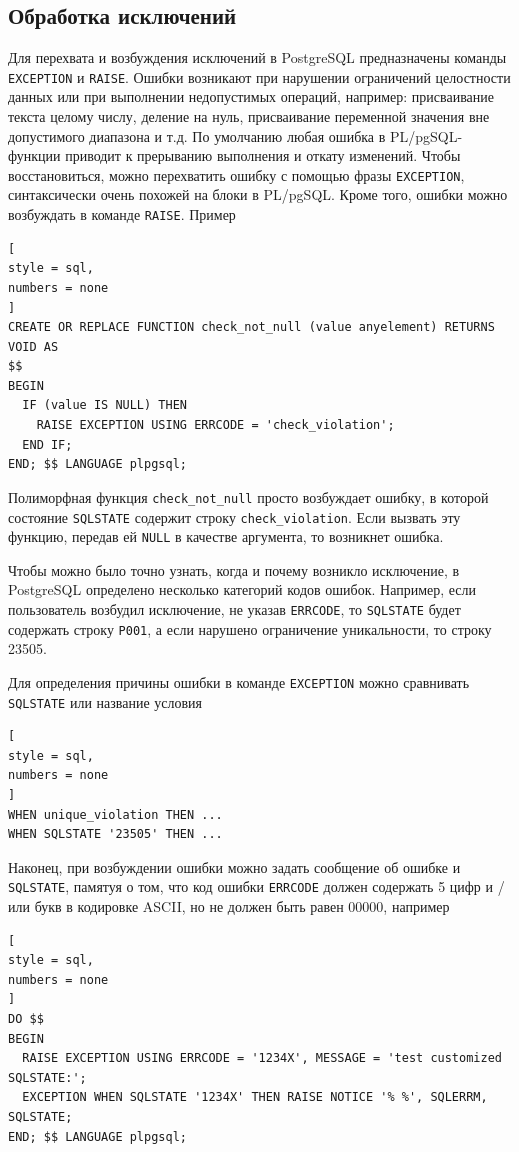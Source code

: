 \documentclass[%
	11pt,
	a4paper,
	utf8,
		]{article}
\begin{document}
\subsection{Обработка исключений}

Для перехвата и возбуждения исключений в PostgreSQL предназначены команды \texttt{EXCEPTION} и \texttt{RAISE}. Ошибки возникают при нарушении ограничений целостности данных или при выполнении недопустимых операций, например: присваивание текста целому числу, деление на нуль, присваивание переменной значения вне допустимого диапазона и т.д. По умолчанию любая ошибка в PL/pgSQL-функции приводит к прерыванию выполнения и откату изменений. Чтобы восстановиться, можно перехватить ошибку с помощью фразы \texttt{EXCEPTION}, синтаксически очень похожей на блоки в PL/pgSQL. Кроме того, ошибки можно возбуждать в команде \texttt{RAISE}.
Пример
\begin{lstlisting}[
style = sql,
numbers = none
]
CREATE OR REPLACE FUNCTION check_not_null (value anyelement) RETURNS VOID AS 
$$
BEGIN
  IF (value IS NULL) THEN
    RAISE EXCEPTION USING ERRCODE = 'check_violation';
  END IF;
END; $$ LANGUAGE plpgsql;
\end{lstlisting}

Полиморфная функция \texttt{check\_not\_null} просто возбуждает ошибку, в которой состояние \texttt{SQLSTATE} содержит строку \texttt{check\_violation}. Если вызвать эту функцию, передав ей \texttt{NULL} в качестве аргумента, то возникнет ошибка.

Чтобы можно было точно узнать, когда и почему возникло исключение, в PostgreSQL определено несколько категорий кодов ошибок. Например, если пользователь возбудил исключение, не указав \texttt{ERRCODE}, то \texttt{SQLSTATE} будет содержать строку \texttt{P001}, а если нарушено ограничение уникальности, то строку 23505.

Для определения причины ошибки в команде \texttt{EXCEPTION} можно сравнивать \texttt{SQLSTATE} или название условия
\begin{lstlisting}[
style = sql,
numbers = none
]
WHEN unique_violation THEN ...
WHEN SQLSTATE '23505' THEN ...
\end{lstlisting}

Наконец, при возбуждении ошибки можно задать сообщение об ошибке и \texttt{SQLSTATE}, памятуя о том, что код ошибки \texttt{ERRCODE} должен содержать 5 цифр и / или букв в кодировке ASCII, но не должен быть равен 00000, например
\begin{lstlisting}[
style = sql,
numbers = none
]
DO $$
BEGIN
  RAISE EXCEPTION USING ERRCODE = '1234X', MESSAGE = 'test customized SQLSTATE:';
  EXCEPTION WHEN SQLSTATE '1234X' THEN RAISE NOTICE '% %', SQLERRM, SQLSTATE;
END; $$ LANGUAGE plpgsql;
\end{lstlisting}
\end{document}
